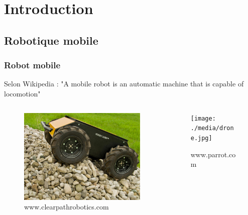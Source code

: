 \section{Introduction}
    
\subsection{Robotique mobile}    
    \begin{frame}
        \frametitle{Robot mobile}
        Selon Wikipedia : "A mobile robot is an automatic machine that is capable of locomotion"
        \begin{columns}[c]                
            \begin{column}{0.45\textwidth}
                \begin{figure}                
                    \includegraphics[width=\textwidth]{./media/husky.jpg}
                    \caption{www.clearpathrobotics.com}
                \end{figure}
            \end{column}     
                            
            \begin{column}{0.45\textwidth}
                \begin{figure}                 
                    \texttt{[image: ./media/drone.jpg]}
                    \caption{www.parrot.com}
                \end{figure}
            \end{column}            
        \end{columns}           
    \end{frame}